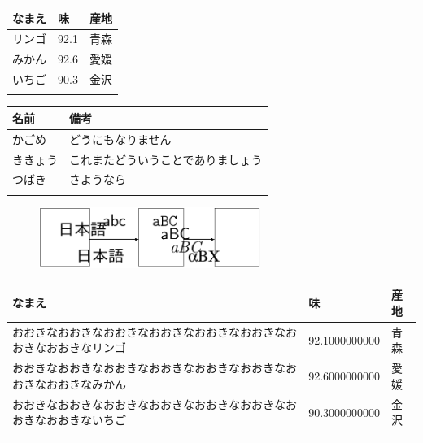 \begin{multicols*}{2}
\begin{table} %
	\centering
	\begin{tabular}{lll}
		\Hline
			なまえ & 味 & 産地\\
		\hline
				リンゴ & 92.1 & 青森\\
				みかん & 92.6 & 愛媛\\
				いちご & 90.3 & 金沢\\
		\Hline
	\end{tabular}
\end{table}

\begin{table} %
	\centering		

	\begin{tabular}{p{5\zw}p{10\zw}}
		\Hline
		名前 & 備考\\
		\hline
		かごめ & どうにもなりません\\
		ききょう & これまたどういうことでありましょう\\
		つばき & さようなら \\
		\Hline
	\end{tabular}
\end{table}

\begin{figure} %
	\centering
	\includegraphics[height=2cm,width=\linewidth]{fig/concept.pdf}
\end{figure}

\begin{table} %
	\centering
{}
	\begin{tabular}{lll}
		\Hline
			なまえ & 味 & 産地\\
		\hline
			おおきなおおきなおおきなおおきなおおきなおおきなおおきなおおきなリンゴ & 92.1000000000 & 青森\\
			おおきなおおきなおおきなおおきなおおきなおおきなおおきなおおきなみかん & 92.6000000000 & 愛媛\\
			おおきなおおきなおおきなおおきなおおきなおおきなおおきなおおきないちご & 90.3000000000 & 金沢\\
		\Hline
	\end{tabular}
\end{table}


\end{multicols*}
